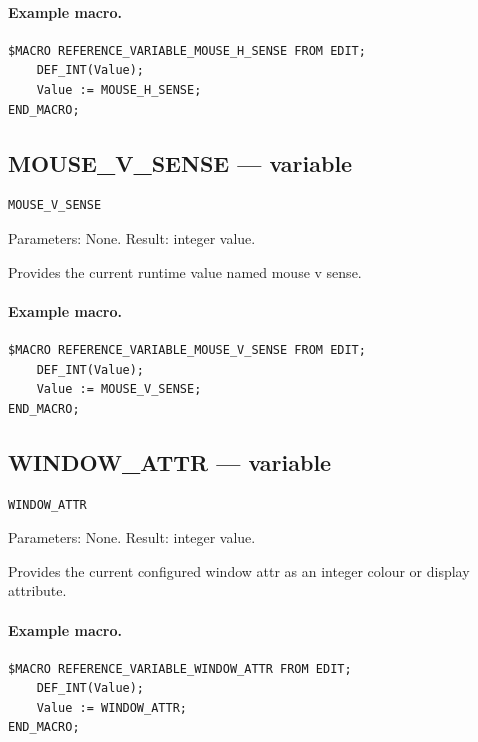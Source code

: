 \documentclass[a4paper,10pt,twoside,openany]{book}
\begin{document}
\paragraph{Example macro.}
\begin{verbatim}
$MACRO REFERENCE_VARIABLE_MOUSE_H_SENSE FROM EDIT;
    DEF_INT(Value);
    Value := MOUSE_H_SENSE;
END_MACRO;
\end{verbatim}

\label{prim:variable-mouse-v-sense}
\subsection*{MOUSE\_V\_SENSE --- variable}
\begin{verbatim}
MOUSE_V_SENSE
\end{verbatim}
Parameters: None. Result: integer value.

Provides the current runtime value named mouse v sense.

\paragraph{Example macro.}
\begin{verbatim}
$MACRO REFERENCE_VARIABLE_MOUSE_V_SENSE FROM EDIT;
    DEF_INT(Value);
    Value := MOUSE_V_SENSE;
END_MACRO;
\end{verbatim}

\label{prim:variable-window-attr}
\subsection*{WINDOW\_ATTR --- variable}
\begin{verbatim}
WINDOW_ATTR
\end{verbatim}
Parameters: None. Result: integer value.

Provides the current configured window attr as an integer colour or display attribute.

\paragraph{Example macro.}
\begin{verbatim}
$MACRO REFERENCE_VARIABLE_WINDOW_ATTR FROM EDIT;
    DEF_INT(Value);
    Value := WINDOW_ATTR;
END_MACRO;
\end{verbatim}

\label{prim:variable-text-color}
\end{document}
